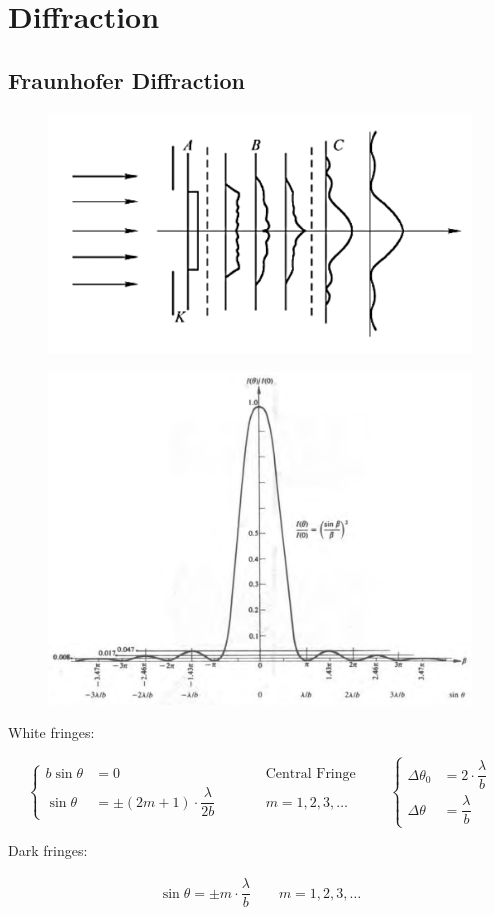 \chapter{Diffraction}

\section{Fraunhofer Diffraction}

\begin{figure}[H]
  \centering
  \includegraphics[width=0.6\linewidth]{figures/Fraunhofer-Fresnel-Diffraction}
\end{figure}

\begin{figure}[H]
  \centering
  \includegraphics[width=0.7\linewidth]{figures/Fraunhofer-Diffraction-Irradance}
\end{figure}

White fringes:

\begin{equation*}
  \left\{
    \begin{aligned}
      b \sin \theta &= 0 && \quad\quad \text{Central Fringe} \\
      \sin \theta &= \pm \left( 2 m + 1 \right) \cdot \dfrac{\lambda}{2b} && \quad\quad m = 1,2,3,\dots
    \end{aligned}
  \right.
  \quad\quad 
  \left\{
    \begin{aligned}
      \Delta \theta_0 &= 2 \cdot \dfrac{\lambda}{b} \\
      \Delta \theta &= \dfrac{\lambda}{b} 
    \end{aligned}
  \right.
\end{equation*}

Dark fringes:

\begin{equation*}
  \begin{aligned}
    \sin \theta = \pm m \cdot \dfrac{\lambda}{b} \quad\quad m = 1,2,3,\dots
  \end{aligned}
\end{equation*}


